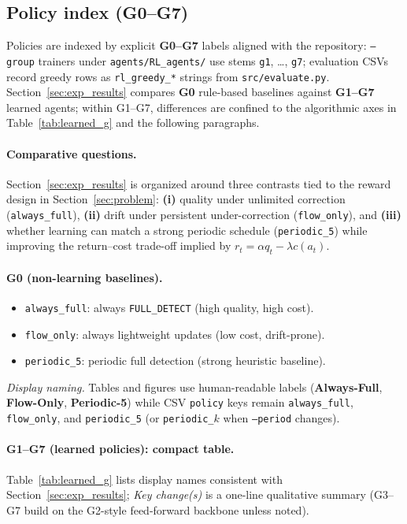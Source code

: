 \documentclass[letterpaper]{article}
\begin{document}
\subsection{Policy index (G0--G7)}
Policies are indexed by explicit \textbf{G0--G7} labels aligned with the repository: \texttt{--group} trainers under \texttt{agents/RL\_agents/} use stems \texttt{g1}, \ldots, \texttt{g7}; evaluation CSVs record greedy rows as \texttt{rl\_greedy\_*} strings from \texttt{src/evaluate.py}. Section~\ref{sec:exp_results} compares \textbf{G0} rule-based baselines against \textbf{G1--G7} learned agents; within G1--G7, differences are confined to the algorithmic axes in Table~\ref{tab:learned_g} and the following paragraphs.

\paragraph{Comparative questions.}
Section~\ref{sec:exp_results} is organized around three contrasts tied to the reward design in Section~\ref{sec:problem}: \textbf{(i)} quality under unlimited correction (\texttt{always\_full}), \textbf{(ii)} drift under persistent under-correction (\texttt{flow\_only}), and \textbf{(iii)} whether learning can match a strong periodic schedule (\texttt{periodic\_5}) while improving the return--cost trade-off implied by $r_t=\alpha q_t-\lambda c(a_t)$.

\paragraph{G0 (non-learning baselines).}
\begin{itemize}[leftmargin=1.2em]
    \item \texttt{always\_full}: always \texttt{FULL\_DETECT} (high quality, high cost).
    \item \texttt{flow\_only}: always lightweight updates (low cost, drift-prone).
    \item \texttt{periodic\_5}: periodic full detection (strong heuristic baseline).
\end{itemize}
\noindent\textit{Display naming.} Tables and figures use human-readable labels (\textbf{Always-Full}, \textbf{Flow-Only}, \textbf{Periodic-5}) while CSV \texttt{policy} keys remain \texttt{always\_full}, \texttt{flow\_only}, and \texttt{periodic\_5} (or \texttt{periodic\_}$k$ when \texttt{--period} changes).

\paragraph{G1--G7 (learned policies): compact table.}
Table~\ref{tab:learned_g} lists display names consistent with Section~\ref{sec:exp_results}; \emph{Key change(s)} is a one-line qualitative summary (G3--G7 build on the G2-style feed-forward backbone unless noted).
\end{document}
